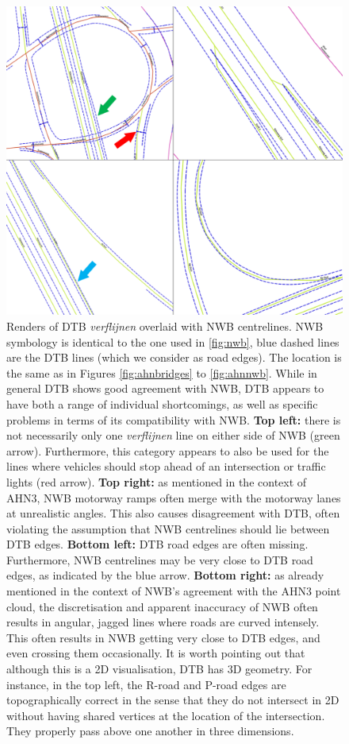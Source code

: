 \begin{figure}
    \centering
    \includegraphics[width=\linewidth]{p2/figs/dtb_sample_07.png} 
    \caption{Renders of DTB \textit{verflijnen} overlaid with NWB centrelines. NWB symbology is identical to the one used in \ref{fig:nwb}, blue dashed lines are the DTB lines (which we consider as road edges). The location is the same as in Figures \ref{fig:ahnbridges} to \ref{fig:ahnnwb}. While in general DTB shows good agreement with NWB, DTB appears to have both a range of individual shortcomings, as well as specific problems in terms of its compatibility with NWB. \textbf{Top left:} there is not necessarily only one \textit{verflijnen} line on either side of NWB (green arrow). Furthermore, this category appears to also be used for the lines where vehicles should stop ahead of an intersection or traffic lights (red arrow). \textbf{Top right:} as mentioned in the context of AHN3, NWB motorway ramps often merge with the motorway lanes at unrealistic angles. This also causes disagreement with DTB, often violating the assumption that NWB centrelines should lie between DTB edges. \textbf{Bottom left:} DTB road edges are often missing. Furthermore, NWB centrelines may be very close to DTB road edges, as indicated by the blue arrow. \textbf{Bottom right:} as already mentioned in the context of NWB’s agreement with the AHN3 point cloud, the discretisation and apparent inaccuracy of NWB often results in angular, jagged lines where roads are curved intensely. This often results in NWB getting very close to DTB edges, and even crossing them occasionally. It is worth pointing out that although this is a 2D visualisation, DTB has 3D geometry. For instance, in the top left, the R-road and P-road edges are topographically correct in the sense that they do not intersect in 2D without having shared vertices at the location of the intersection. They properly pass above one another in three dimensions.}
    \label{fig:dtbnwb}
\end{figure}

